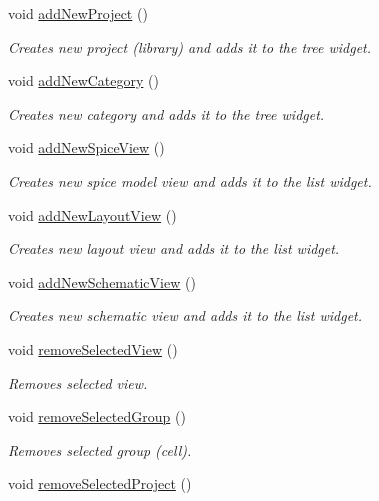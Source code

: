 \begin{DoxyCompactItemize}
void \hyperlink{classMainWindow_a80f2c79d5fd4ef7c0a5cf55e5a2bdb78}{add\-New\-Project} ()
\begin{DoxyCompactList}\small\item\em Creates new project (library) and adds it to the tree widget. \end{DoxyCompactList}\item 
void \hyperlink{classMainWindow_a24f572a26e33ee7b4115efd4ab6658e9}{add\-New\-Category} ()
\begin{DoxyCompactList}\small\item\em Creates new category and adds it to the tree widget. \end{DoxyCompactList}\item 
void \hyperlink{classMainWindow_a4525ad9b4f0f3df104a1f558f653f4a0}{add\-New\-Spice\-View} ()
\begin{DoxyCompactList}\small\item\em Creates new spice model view and adds it to the list widget. \end{DoxyCompactList}\item 
void \hyperlink{classMainWindow_ab2e15383545f27e0f07fdb84e714d18e}{add\-New\-Layout\-View} ()
\begin{DoxyCompactList}\small\item\em Creates new layout view and adds it to the list widget. \end{DoxyCompactList}\item 
void \hyperlink{classMainWindow_ad3a1c8710698214361128232cbde335d}{add\-New\-Schematic\-View} ()
\begin{DoxyCompactList}\small\item\em Creates new schematic view and adds it to the list widget. \end{DoxyCompactList}\item 
void \hyperlink{classMainWindow_ae8d8ed40aae7c5b596efac98925792ee}{remove\-Selected\-View} ()
\begin{DoxyCompactList}\small\item\em Removes selected view. \end{DoxyCompactList}\item 
void \hyperlink{classMainWindow_ae91780a31e7118b44feb428b0de0dba3}{remove\-Selected\-Group} ()
\begin{DoxyCompactList}\small\item\em Removes selected group (cell). \end{DoxyCompactList}\item 
void \hyperlink{classMainWindow_aa77bfbfc58c63a5f3ce5d6f718a55a40}{remove\-Selected\-Project} ()

\end{DoxyCompactItemize}
